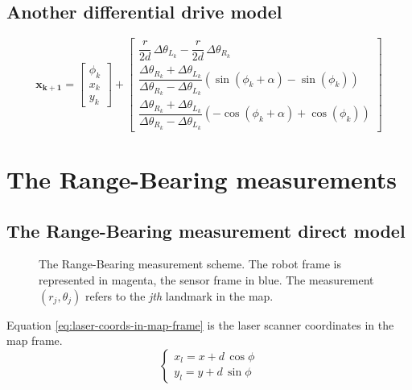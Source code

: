 \documentclass[12pt]{article}
\begin{document}
\subsection{Another differential drive model}
\renewcommand{\arraystretch}{1.5}
\begin{equation}
    \mathbf{x_{k+1}} = \begin{bmatrix}
        \phi_k \\ x_k \\ y_k
    \end{bmatrix} + 
    \begin{bmatrix}
        \dfrac{r}{2d}\,\Delta\theta_{L_k} - \dfrac{r}{2d} \,\Delta\theta_{R_k} \\
        \dfrac{\Delta\theta_{R_k} + \Delta\theta_{L_k}}{\Delta\theta_{R_k} - \Delta\theta_{L_k}}\left( \sin(\phi_k + \alpha) - \sin(\phi_k) \right) \\
        \dfrac{\Delta\theta_{R_k} + \Delta\theta_{L_k}}{\Delta\theta_{R_k} - \Delta\theta_{L_k}}\left( -\cos(\phi_k + \alpha) + \cos(\phi_k) \right) 
    \end{bmatrix}
\end{equation}
\renewcommand{\arraystretch}{1}

\section{The Range-Bearing measurements}
\subsection{The Range-Bearing measurement direct model}
\begin{figure}[h]
    \centering
    
    \caption{The Range-Bearing measurement scheme. The robot frame is represented in magenta, the sensor frame in blue. The measurement $(r_j, \theta_j)$ refers to the \textit{jth} landmark in the map.}
    \label{fig:range-bearing-measurement-schematic}
\end{figure}

Equation \ref{eq:laser-coords-in-map-frame} is the laser scanner coordinates in the map frame.
\begin{equation}
    \begin{cases}
    x_l = x + d\,\cos\phi \\
    y_l = y + d\,\sin\phi 
    \end{cases}
    \label{eq:laser-coords-in-map-frame}
\end{equation}
\end{document}
